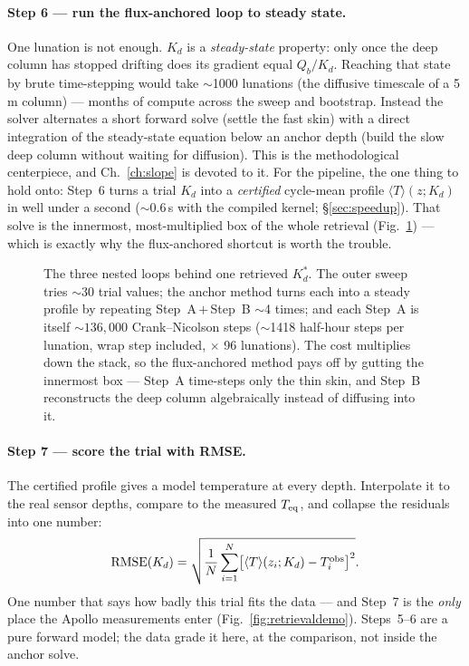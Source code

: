 \documentclass[11pt]{report}
\newcommand{\Tm}{\langle T\rangle}
\begin{document}
\paragraph{\textbf{Step 6 --- run the flux-anchored loop to steady state.}}
One lunation is not enough. $K_d$ is a \emph{steady-state} property: only once
the deep column has stopped drifting does its gradient equal $Q_b/K_d$. Reaching
that state by brute time-stepping would take $\sim$1000 lunations (the diffusive
timescale of a 5\,m column) --- months of compute across the sweep and bootstrap.
Instead the solver alternates a short forward solve (settle the fast skin) with a
direct integration of the steady-state equation below an anchor depth (build the
slow deep column without waiting for diffusion). This is the methodological
centerpiece, and Ch.~\ref{ch:slope} is devoted to it. For the pipeline, the one
thing to hold onto: Step~6 turns a trial $K_d$ into a \emph{certified}
cycle-mean profile $\Tm(z;K_d)$ in well under a second ($\sim$0.6\,s with
the compiled kernel; \S\ref{sec:speedup}). That solve is the innermost,
most-multiplied box of the whole retrieval (Fig.~\ref{fig:costnesting}) --- which
is exactly why the flux-anchored shortcut is worth the trouble.

\begin{figure}[htbp]\centering

\caption{The three nested loops behind one retrieved $K_d^{*}$. The outer sweep
tries ${\sim}30$ trial values; the anchor method turns each into a steady profile
by repeating Step~A\,$+$\,Step~B $\sim$4 times; and each Step~A is itself
${\sim}136{,}000$ Crank--Nicolson steps ($\sim$1418 half-hour steps per
lunation, wrap step included, $\times$ 96 lunations). The cost multiplies down the stack, so the flux-anchored method pays
off by gutting the innermost box --- Step~A time-steps only the thin skin, and
Step~B reconstructs the deep column algebraically instead of diffusing into it.}
\label{fig:costnesting}
\end{figure}

\paragraph{\textbf{Step 7 --- score the trial with RMSE.}}
The certified profile gives a model temperature at every depth. Interpolate it to
the real sensor depths, compare to the measured $T_{\rm eq}$, and collapse the
residuals into one number:
\begin{equation}
\mathrm{RMSE}(K_d)=\sqrt{\frac{1}{N}\sum_{i=1}^{N}\bigl[\Tm(z_i;K_d)-T^{\rm obs}_i\bigr]^2}.
\label{eq:rmse}
\end{equation}
One number that says how badly this trial fits the data --- and Step~7 is the
\emph{only} place the Apollo measurements enter (Fig.~\ref{fig:retrievaldemo}).
Steps~5--6 are a pure forward model; the data grade it here, at the comparison,
not inside the anchor solve.
\end{document}
